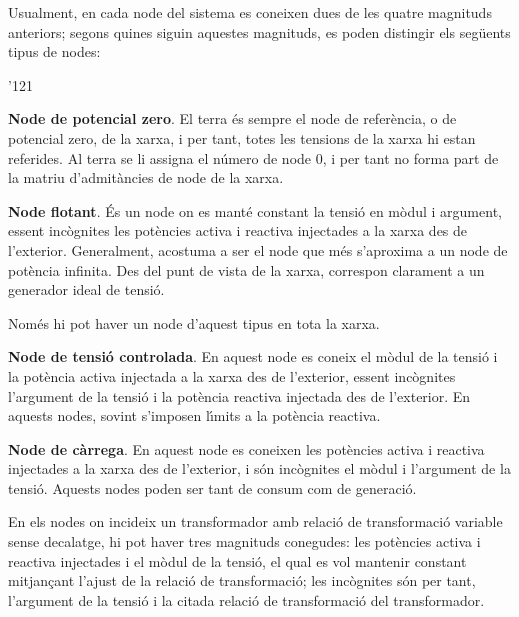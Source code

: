 Usualment, en cada node del sistema es coneixen dues de les quatre magnituds anteriors;
segons quines siguin aquestes magnituds, es poden distingir els seg\"{u}ents tipus de nodes:
\begin{dinglist}{'121}
    \item \textbf{Node de potencial zero}. El terra \'{e}s sempre el node de refer\`{e}ncia, o de potencial zero, de la
    xarxa, i per tant, totes les tensions de la xarxa hi estan referides. Al terra se li
    assigna el n\'{u}mero de node 0, i per tant no forma part de la matriu d'admit\`{a}ncies de node de la xarxa.

   \item \textbf{Node flotant}. \'{E}s un node on es mant\'{e} constant la tensi\'{o} en m\`{o}dul i argument,
   essent inc\`{o}gnites les pot\`{e}ncies activa i reactiva injectades a la xarxa des de l'exterior.
    Generalment, acostuma a ser el node que m\'{e}s s'aproxima a un node de pot\`{e}ncia infinita. Des del
    punt de vista de la xarxa, correspon clarament a un generador ideal de tensi\'{o}.

Nom\'{e}s hi pot haver un node d'aquest tipus en tota la xarxa.
   \item \textbf{Node de tensi\'{o} controlada}. En aquest node es coneix el m\`{o}dul de la tensi\'{o} i la
   pot\`{e}ncia activa injectada a la xarxa des de l'exterior, essent inc\`{o}gnites l'argument de la tensi\'{o} i la pot\`{e}ncia
   reactiva injectada des de l'exterior. En aquests nodes, sovint s'imposen l\'{\i}mits a la pot\`{e}ncia reactiva.

   \item \textbf{Node de c\`{a}rrega}. En aquest node es coneixen les pot\`{e}ncies activa i reactiva
   injectades a la xarxa des de l'exterior, i s\'{o}n inc\`{o}gnites el m\`{o}dul i l'argument de la tensi\'{o}.
   Aquests nodes poden ser tant de consum com de generaci\'{o}.

En els nodes on incideix un transformador amb relaci\'{o} de transformaci\'{o} variable sense decalatge, hi pot
haver tres magnituds conegudes: les pot\`{e}ncies activa i reactiva injectades i el m\`{o}dul de
la tensi\'{o}, el qual es vol mantenir constant mitjan\c{c}ant l'ajust de la relaci\'{o} de
transformaci\'{o}; les inc\`{o}gnites s\'{o}n per tant, l'argument de la tensi\'{o} i la citada relaci\'{o} de
transformaci\'{o} del transformador.
\end{dinglist}

